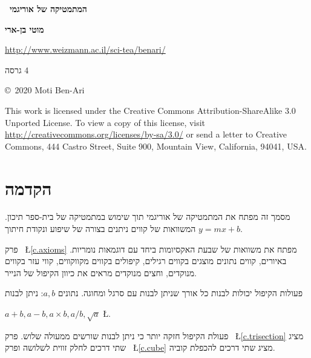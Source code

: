 
\thispagestyle{empty}

\begin{center}
\textbf{\Huge\ המתמטיקה של אוריגמי}

\bigskip
\bigskip

\textbf{\LARGE מוטי בן-ארי}

\bigskip
\bigskip
{}
\url{http://www.weizmann.ac.il/sci-tea/benari/}

\bigskip
\bigskip

{\large
גרסה
$4$
}
\end{center}

\vfill

\begin{small}
\begin{center}
\copyright{}\ 2020 Moti Ben-Ari
\end{center}

This work is licensed under the Creative Commons Attribution-ShareAlike 3.0 Unported License. To view a copy of this license, visit \url{http://creativecommons.org/licenses/by-sa/3.0/} or send a letter to Creative Commons, 444 Castro Street, Suite 900, Mountain View, California, 94041, USA.
\end{small}
\tableofcontents



\chapter{הקדמה}\label{c.introduction}

מסמך זה מפתח את המתמטיקה של אוריגמי תוך שימוש במתמטיקה של בית-ספר תיכון. המשוואות של קווים ניתנים בצורה של שיפוע ונקודת חיתוך
$y=mx+b$.

פרק%
~\L{\ref{c.axioms}}
מפתח את משוואות של שבעת האקסיומות ביחד עם דוגמאות נומריות. באיורים, קווים נתונים מוצגים בקווים רגילים, קיפולים בקווים מקווקווים, קווי עזר בקווים מנוקדים, וחצים מנוקדים מראים את כיוון הקיפול של הנייר.

פעולות הקיפול יכולות לבנות כל אורך שניתן לבנות עם סרגל ומחוגה. נתונים 
$a,b$:
ניתן לבנות

$a+b, a-b, a\times b, a/b, \sqrt{a}$
\L{\cite[4~]{hwa}}.

פעולת הקיפול חזקה יותר כי ניתן לבנות שורשים ממעולה שלוש. פרק%
~\L{\ref{c.trisection}}
מציג שתי דרכים לחלק זווית לשלושה ופרק%
~\L{\ref{c.cube}}
מציג שתי דרכים להכפלת קוביה.

